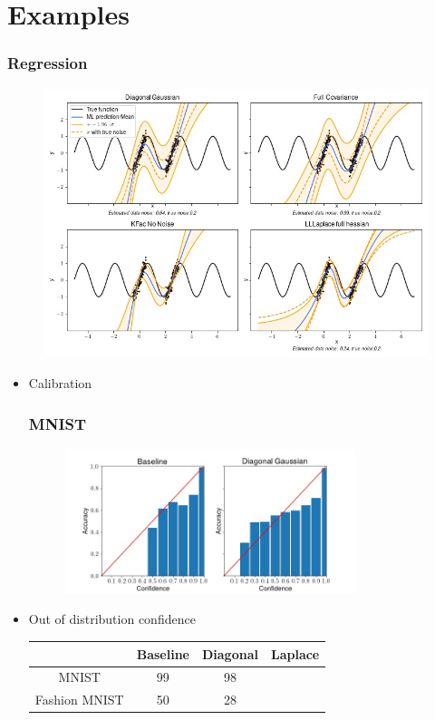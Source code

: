 \documentclass{beamer}
\begin{document}
        \section{Examples}

        \begin{frame}
            \frametitle{Regression}
            \begin{figure}
                \includegraphics[width=\textwidth]{images/Regression/kernel_comparison.jpg}
            \end{figure}
        \end{frame}
        
        
        \begin{frame}
            
            \begin{itemize}
                \item  Calibration\\
                \frametitle{MNIST}
                \begin{figure}
                    \includegraphics[width=0.8\textwidth]{images/MNIST/calibration.jpg}
                \end{figure}
                \item Out of distribution confidence \\[10pt]
                \centering
                \begin{tabular}{c|c|c|c}
                    & Baseline & Diagonal & Laplace \\
                    \hline
                    MNIST & 99 & 98 & \\
                    Fashion MNIST & 50 & 28 & 
                \end{tabular}
            \end{itemize}
        \end{frame}
        
\end{document}
